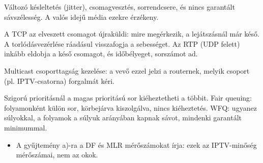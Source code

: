 Változó késleltetés (jitter), csomagvesztés, sorrendcsere, és nincs garantált sávszélesség. A valós idejű média ezekre érzékeny.

A TCP az elveszett csomagot újraküldi: mire megérkezik, a lejátszásnál már késő. A torlódásvezérlése ráadásul visszafogja a sebességet. Az RTP (UDP felett) inkább eldobja a késő csomagot, és időbélyeget, sorszámot ad.

Multicast csoporttagság kezelése: a vevő ezzel jelzi a routernek, melyik csoport (pl. IPTV-csatorna) forgalmát kéri.

Szigorú prioritásnál a magas prioritású sor kiéheztetheti a többit. Fair queuing: folyamonként külön sor, körbejárva kiszolgálva, nincs kiéheztetés. WFQ: ugyanez súlyokkal, a folyamok a súlyuk arányában kapnak sávot, mindenki garantált minimummal.
\begin{eredmeny}

\begin{center}\end{center}
\end{eredmeny}
\begin{tipp}[Ellenőrzés]
\begin{itemize}
\item A gyűjtemény a)-ra a DF és MLR mérőszámokat írja: ezek az IPTV-minőség mérőszámai, nem az okok.
\end{itemize}
\end{tipp}
